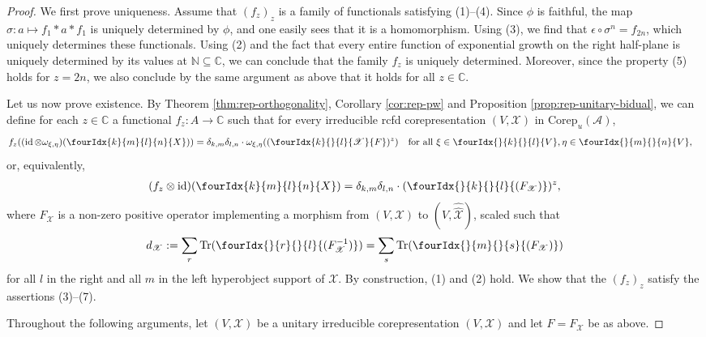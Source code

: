 \documentclass[10pt]{article}
\DeclareMathOperator{\id}{id}
\newcommand{\dualco}[1]{\hat{#1}}
\newcommand{\Corep}{\mathrm{Corep}}
\newcommand{\C}{\mathbb{C}}
\newcommand{\N}{\mathbb{N}}
\newcommand{\Tr}{\mathrm{Tr}}
\newcommand{\Gr}[5]{\fourIdx{#2}{#4}{#3}{#5}{#1}}%
\newcommand{\Gru}[3]{\Gr{#1}{}{}{#2}{#3}}
\theoremstyle{definition}
\numberwithin{equation}{section}
\begin{document}
\begin{proof}
  We first prove uniqueness.  Assume that $(f_{z})_{z}$ is a family of
  functionals satisfying (1)--(4).  Since $\phi$ is faithful, the map
  $\sigma\colon a \mapsto f_{1} \ast a \ast f_{1}$ is uniquely
  determined by $\phi$, and one easily sees that it is a homomorphism. Using
  (3), we find that $\epsilon \circ \sigma^n=f_{2n}$, which uniquely determines these functionals. Using (2) and the
  fact that every entire function of exponential growth on the right
  half-plane is uniquely determined by its values at $\N \subseteq \C$, we can conclude that the family $f_{z}$ is uniquely determined. Moreover, since the property (5) holds for $z = 2n$, we also conclude by the same argument as above that it holds for all $z\in \C$.

  Let us now prove existence.  By Theorem \ref{thm:rep-orthogonality}, Corollary \ref{cor:rep-pw} and Proposition \ref{prop:rep-unitary-bidual}, we can
  define for each $z\in \C$ a functional $f_{z} \colon A \to \C$ such
  that for every 
  irreducible rcfd corepresentation
  $(V,\mathscr{X})$ in $\Corep_{u}(\mathscr{A})$,
    \begin{align*}
      f_{z}((\id \otimes \omega_{\xi,\eta})(\Gr{X}{k}{l}{m}{n})) &=
      \delta_{k,m}\delta_{l,n} \cdot
      \omega_{\xi,\eta}((\Gr{F}{k}{l}{}{\mathscr{X}})^{z}) \quad \text{for all }
      \xi \in \Gru{V}{k}{l},\eta \in
      \Gru{V}{m}{n},
    \end{align*}
    or, equivalently,
    \begin{align*}
      (f_{z} \otimes \id)(\Gr{X}{k}{l}{m}{n}) =
      \delta_{k,m}\delta_{l,n} \cdot (\Gru{(F_{\mathscr{X}})}{k}{l})^{z},
    \end{align*}
    where $F_{\mathscr{X}}$ is a non-zero positive operator implementing a morphism from $(V,\mathscr{X})$ to
    $(V, \dualco{\dualco{\mathscr{X}}})$, scaled such that
    \begin{align*}
      d_{\mathscr{X}}:= \sum_{r} \Tr(\Gru{(F_{\mathscr{X}}^{-1})}{r}{l}) = \sum_{s}
      \Tr(\Gru{(F_{\mathscr{X}})}{m}{s})
    \end{align*}
    for all $l$ in the right and all $m$ in the left hyperobject support of $\mathscr{X}$. By
    construction, (1) and (2) hold. We show that the $(f_{z})_{z}$ satisfy the
    assertions (3)--(7). 

        Throughout the following arguments, let 
    $(V,\mathscr{X})$ be a unitary irreducible corepresentation
    $(V,\mathscr{X})$ and let $F=F_{\mathscr{X}}$ be as above.


\end{proof}
\end{document}
